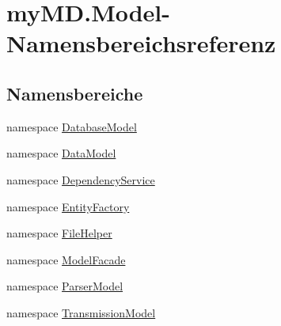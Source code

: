 \hypertarget{namespacemy_m_d_1_1_model}{}\section{my\+M\+D.\+Model-\/\+Namensbereichsreferenz}
\label{namespacemy_m_d_1_1_model}
\subsection*{Namensbereiche}
\begin{DoxyCompactItemize}
\item 
namespace \mbox{\hyperlink{namespacemy_m_d_1_1_model_1_1_database_model}{Database\+Model}}
\item 
namespace \mbox{\hyperlink{namespacemy_m_d_1_1_model_1_1_data_model}{Data\+Model}}
\item 
namespace \mbox{\hyperlink{namespacemy_m_d_1_1_model_1_1_dependency_service}{Dependency\+Service}}
\item 
namespace \mbox{\hyperlink{namespacemy_m_d_1_1_model_1_1_entity_factory}{Entity\+Factory}}
\item 
namespace \mbox{\hyperlink{namespacemy_m_d_1_1_model_1_1_file_helper}{File\+Helper}}
\item 
namespace \mbox{\hyperlink{namespacemy_m_d_1_1_model_1_1_model_facade}{Model\+Facade}}
\item 
namespace \mbox{\hyperlink{namespacemy_m_d_1_1_model_1_1_parser_model}{Parser\+Model}}
\item 
namespace \mbox{\hyperlink{namespacemy_m_d_1_1_model_1_1_transmission_model}{Transmission\+Model}}
\end{DoxyCompactItemize}
